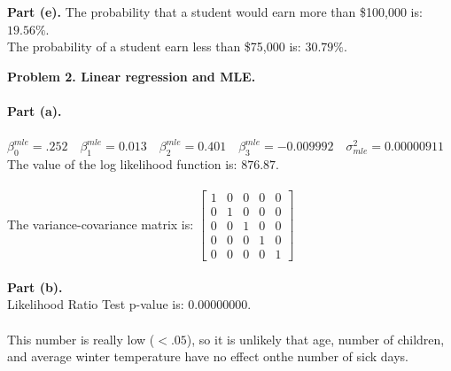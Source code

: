\documentclass[letterpaper,12pt]{article}
\theoremstyle{definition}
\begin{document}
\noindent\textbf{Part (e).}
The probability that a student would earn more than \$100,000 is: $19.56\%$.\\
The probability of a student earn less than \$75,000 is: $30.79\%$.\\

\newpage

\noindent\textbf{Problem 2. Linear regression and MLE.}\\
\\
\noindent\textbf{Part (a).}\\
\\
$\beta^{mle}_{0} = .252\quad \beta^{mle}_{1} = 0.013\quad\beta^{mle}_{2} = 0.401\quad \beta^{mle}_{3} = -0.009992\quad\sigma^{2}_{mle}=0.00000911$
\\
The value of the log likelihood function is: $876.87$.
\\
\\
The variance-covariance matrix is:
$
\begin{bmatrix}
 1&  0&  0&  0&0 \\ 
 0&  1&  0&  0&0 \\ 
 0&  0&  1&  0&0 \\ 
 0&  0&  0&  1&0 \\ 
 0&  0&  0&  0&1
\end{bmatrix}
$
\\
\\
\noindent\textbf{Part (b).}
\\
Likelihood Ratio Test p-value is: 0.00000000.\\
\\
This number is really low ($< .05$), so it is unlikely that age, number of children, and average winter temperature have no effect onthe number of sick days.\\
\end{document}
